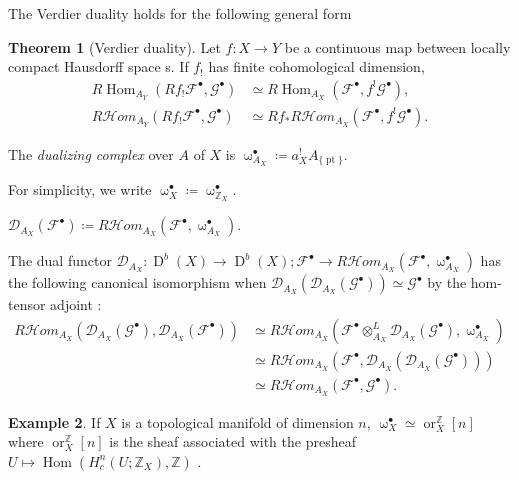 \documentclass[a4paper,dvipdfmx,reqno,12pt]{amsart}
\theoremstyle{definition}
\newtheorem{theorem}{Theorem}[section]
\newtheorem{example}[theorem]{Example}
\newcommand{\deq}{\coloneqq}
\newcommand{\Z}{\mathbb{Z}}%
\newcommand{\mcal}[1]{\mathcal{#1}}%
\newcommand{\opn}[1]{\operatorname{#1}}
\numberwithin{equation}{section}
\begin{document}
The Verdier duality holds for the following general form
\cite[Proposition 3.1.10]{MR1299726}


\begin{theorem}[{Verdier duality}]
Let $f\colon X\to Y$ be a continuous map between locally 
compact Hausdorff space s. If $f_!$ has finite cohomological
dimension, 
\begin{align}
R\opn{Hom}_{A_Y}(R f_!\mcal{F}^{\bullet},\mcal{G}^{\bullet})    & \simeq R\opn{Hom}_{A_X}(\mcal{F}^{\bullet},f^{!}\mcal{G}^{\bullet}),        \\
R \mcal{H}om_{A_Y}(R f_! \mcal{F}^{\bullet},\mcal{G}^{\bullet}) & \simeq Rf_* R\mcal{H}om_{A_X}(\mcal{F}^{\bullet},f^{!}\mcal{G}^{\bullet}).
\end{align}
\end{theorem}



The \emph{dualizing complex} over $A$ of $X$ is 
$\upomega_{A_X}^{\bullet}\deq a^{!}_{X}A_{\{\opn{pt}\}}$.

For simplicity, we write 
$\upomega_X^{\bullet}\deq 
\upomega_{\mathbb{Z}_X}^{\bullet}$.

$\mathcal{D}_{A_X}(\mathcal{F}^{\bullet})
\deq R\mathcal{H}om_{A_X}(\mathcal{F}^{\bullet},
\upomega_{A_X}^{\bullet})$.

The dual functor
$\mathcal{D}_{A_X}\colon \opn{D}^{b}(X)\to 
\opn{D}^{b}(X); \mathcal{F}^{\bullet} \to  R\mathcal{H}om_{A_X}(\mathcal{F}^{\bullet},
\upomega_{A_X}^{\bullet})$
has the following canonical isomorphism when 
$\mathcal{D}_{A_X}(\mathcal{D}_{A_X}(\mathcal{G}^{\bullet}))
\simeq \mathcal{G}^{\bullet}$ by the hom-tensor adjoint
\cite[Proposition 2.6.3]{MR1299726}:
\begin{align}
R\mathcal{H}om_{A_X}
(\mathcal{D}_{A_X}(\mathcal{G}^{\bullet}),
\mathcal{D}_{A_X}(\mathcal{F}^{\bullet})) 
& \simeq R\mathcal{H}om_{A_X}
(\mathcal{F}^{\bullet}\otimes^{L}_{A_X}
\mathcal{D}_{A_X}(\mathcal{G}^{\bullet}),
\upomega_{A_X}^{\bullet}) \\
& \simeq R\mathcal{H}om_{A_X}
(\mathcal{F}^{\bullet},
\mathcal{D}_{A_X}(\mathcal{D}_{A_X}(\mathcal{G}^{\bullet}))) \\
& \simeq R\mathcal{H}om_{A_X}
(\mathcal{F}^{\bullet},
\mathcal{G}^{\bullet}).
\end{align}


\begin{example}
If $X$ is a topological manifold of dimension $n$, 
$\upomega^{\bullet}_{X}\simeq \opn{or}_{X}^{\Z}[n]$ 
where $\opn{or}_{X}^{\mathbb{Z}}[n]$ is the sheaf 
associated with the presheaf $U\mapsto 
\opn{Hom}(H^{n}_c(U;\mathbb{Z}_{X}),\mathbb{Z})$
\cite[Proposition 3.3.6]{MR1299726}.
\end{example}
\end{document}
